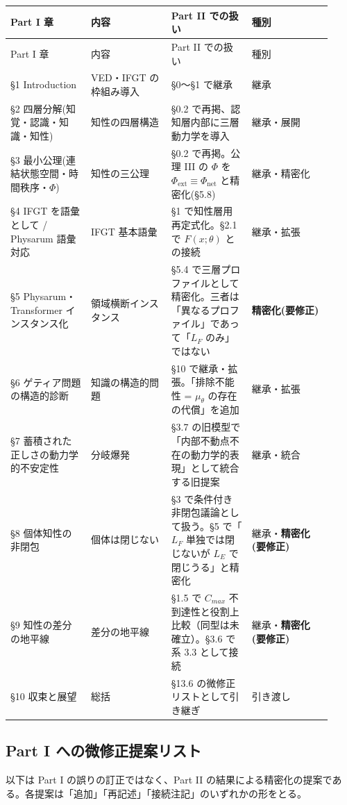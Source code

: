 \begin{longtable}{@{}p{0.23\linewidth}p{0.23\linewidth}p{0.23\linewidth}p{0.23\linewidth}@{}}
\toprule
Part I 章 & 内容 & Part II での扱い & 種別 \\
\midrule
\endfirsthead
\toprule
Part I 章 & 内容 & Part II での扱い & 種別 \\
\midrule
\endhead
\S{}1 Introduction & VED・IFGT の枠組み導入 & \S{}0〜\S{}1 で継承 & 継承 \\
\S{}2 四層分解(知覚・認識・知識・知性) & 知性の四層構造 & \S{}0.2 で再掲、認知層内部に三層動力学を導入 & 継承・展開 \\
\S{}3 最小公理(連結状態空間・時間秩序・$\Phi$) & 知性の三公理 & \S{}0.2 で再掲。公理 III の $\Phi$ を $\Phi_{\text{ext}} \equiv \Phi_{\text{net}}$ と精密化(\S{}5.8) & 継承・精密化 \\
\S{}4 IFGT を語彙として / Physarum 語彙対応 & IFGT 基本語彙 & \S{}1 で知性層用再定式化。\S{}2.1 で $F(x;\theta)$ との接続 & 継承・拡張 \\
\S{}5 Physarum・Transformer インスタンス化 & 領域横断インスタンス & \S{}5.4 で三層プロファイルとして精密化。三者は「異なるプロファイル」であって「$L_F$ のみ」ではない & \textbf{精密化(要修正)} \\
\S{}6 ゲティア問題の構造的診断 & 知識の構造的問題 & \S{}10 で継承・拡張。「排除不能性 = $\mu_\theta$ の存在の代償」を追加 & 継承・拡張 \\
\S{}7 蓄積された正しさの動力学的不安定性 & 分岐爆発 & \S{}3.7 の旧模型で「内部不動点不在の動力学的表現」として統合する旧提案 & 継承・統合 \\
\S{}8 個体知性の非閉包 & 個体は閉じない & \S{}3 で条件付き非閉包議論として扱う。\S{}5 で「$L_F$ 単独では閉じないが $L_E$ で閉じうる」と精密化 & 継承・\textbf{精密化(要修正)} \\
\S{}9 知性の差分の地平線 & 差分の地平線 & \S{}1.5 で $C_{max}$ 不到達性と役割上比較（同型は未確立）。\S{}3.6 で系 3.3 として接続 & 継承・\textbf{精密化(要修正)} \\
\S{}10 収束と展望 & 総括 & \S{}13.6 の微修正リストとして引き継ぎ & 引き渡し \\
\bottomrule
\end{longtable}


\bigskip


\subsection{Part I への微修正提案リスト}


以下は Part I の誤りの訂正ではなく、Part II の結果による精密化の提案である。各提案は「追加」「再記述」「接続注記」のいずれかの形をとる。

